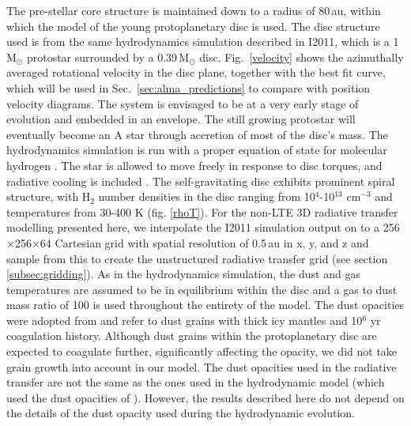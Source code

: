 \documentclass[useAMS,usenatbib]{mn2e}
\begin{document}
The pre-stellar core structure is maintained down to a radius of 80\,au, within which the model of the young protoplanetary disc is used. The disc structure used is from the same hydrodynamics simulation described in I2011, which is a 1$\,$M$_\odot$ protostar surrounded by a 0.39$\,$M$_\odot$ disc. Fig.~\ref{velocity} shows the azimuthally averaged rotational velocity in the disc plane, together with the best fit curve, which will be used in Sec.~\ref{sec:alma_predictions} to compare with position velocity diagrams. The system is envisaged to be at a very early stage of evolution and embedded in an envelope.  The still growing protostar will eventually become an A star through accretion of most of the disc's mass. The hydrodynamics simulation is run with a proper equation of state for molecular hydrogen \citep{Boley2007}.  The star is allowed to move freely in response to disc torques, and radiative cooling is included \citep{Boley2009}. The self-gravitating disc exhibits prominent spiral structure, with H$_2$ number densities in the disc ranging from 10$^4$-10$^{13}$ cm$^{-3}$ and temperatures from 30-400 K (fig. \ref{rhoT}). For the non-LTE 3D radiative transfer modelling presented here, we interpolate the I2011 simulation output on to a 256$\times$256$\times$64 Cartesian grid with spatial resolution of 0.5$\,$au in x, y, and z and sample from this to create the unstructured radiative transfer grid (see section \ref{subsec:gridding}).  As in the hydrodynamics simulation, the dust and gas temperatures are assumed to be in equilibrium within the disc and a gas to dust mass ratio of 100 is used throughout the entirety of the model. The dust opacities were adopted from \citet{Ossenkopf1994} and refer to dust grains with thick icy mantles and 10$^6$ yr coagulation history.  Although dust grains within the protoplanetary disc are expected to coagulate further,  significantly affecting the opacity, we did not take grain growth into account in our model.  The dust opacities used in the radiative transfer are not the same as the ones used in the hydrodynamic model (which used the dust opacities of \citealt{DAlessio2001}). However, the results described here do not depend on the details of the dust opacity used during the hydrodynamic evolution.\smallskip
\end{document}
